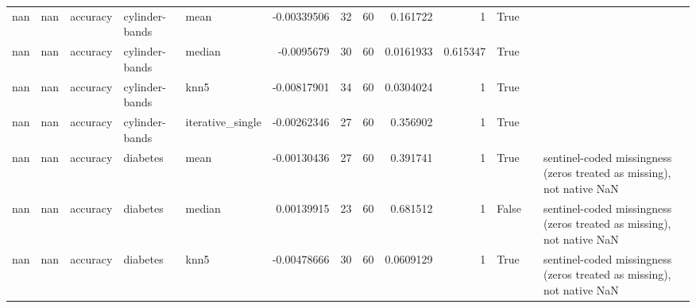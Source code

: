 \begin{table}[ht]
{\begin{tabular}{rrlllrrrrrlll}
        nan &     nan & accuracy                       & cylinder-bands & mean             &     -0.00339506  &                  32 &      60 & 0.161722    & 1           & True               &                                                                                                                    &                                                                       \\
        nan &     nan & accuracy                       & cylinder-bands & median           &     -0.0095679   &                  30 &      60 & 0.0161933   & 0.615347    & True               &                                                                                                                    &                                                                       \\
        nan &     nan & accuracy                       & cylinder-bands & knn5             &     -0.00817901  &                  34 &      60 & 0.0304024   & 1           & True               &                                                                                                                    &                                                                       \\
        nan &     nan & accuracy                       & cylinder-bands & iterative\_single &     -0.00262346  &                  27 &      60 & 0.356902    & 1           & True               &                                                                                                                    &                                                                       \\
        nan &     nan & accuracy                       & diabetes       & mean             &     -0.00130436  &                  27 &      60 & 0.391741    & 1           & True               &                                                                                                                    & sentinel-coded missingness (zeros treated as missing), not native NaN \\
        nan &     nan & accuracy                       & diabetes       & median           &      0.00139915  &                  23 &      60 & 0.681512    & 1           & False              &                                                                                                                    & sentinel-coded missingness (zeros treated as missing), not native NaN \\
        nan &     nan & accuracy                       & diabetes       & knn5             &     -0.00478666  &                  30 &      60 & 0.0609129   & 1           & True               &                                                                                                                    & sentinel-coded missingness (zeros treated as missing), not native NaN \\

\end{tabular}}
\end{table}
